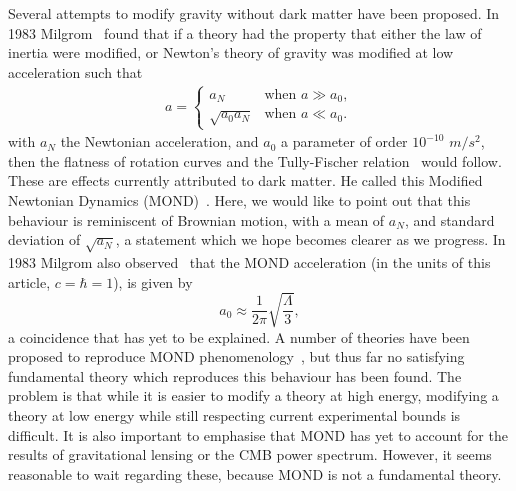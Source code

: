 \documentclass[aps,pra,amsmath,amssymb,amsthm,floatfix,nofootinbib,notitlepage,superscriptaddress,10pt]{revtex4-2}
\begin{document}
Several attempts to modify gravity without dark matter have been proposed. In 1983 Milgrom~\cite{milgrom1983modification} found that if a theory had the property that either the law of inertia were modified, or Newton's theory of gravity was modified at low acceleration such that
\begin{align}
a = 
\begin{cases} 
	a_N & \text{when } a \gg a_0, \\
	\sqrt{a_0 a_N} & \text{when } a \ll a_0.
\end{cases}
\label{eq:MONDish}
\end{align}
with $a_N$ the Newtonian acceleration, and $a_0$ a parameter of order $10^{-10}$ $m/s^2$, then  the flatness of rotation curves and the Tully-Fischer relation~\cite{TullyFisher} would follow. These are effects currently attributed to dark matter. He called this Modified Newtonian Dynamics (MOND)~\cite{sanders2002modified,bekenstein2006modified,milgrom2008mond}. Here, we would like to point out that this behaviour is reminiscent of Brownian motion, with a mean of $a_N$, and standard deviation of $\sqrt{a_N}$, a statement which we hope becomes clearer as we progress. 
In 1983 Milgrom also observed~\cite{milgrom1983modification} that the MOND acceleration (in the units of this article, $c=\hbar=1$), is given by 
   \begin{equation}
        a_0\approx\frac{1}{2\pi}\sqrt{\frac{\Lambda}{3}},
        \label{eq: coincidence}
    \end{equation}
a coincidence that has yet to be explained.  A number of theories have been proposed to reproduce MOND phenomenology~\cite{bekenstein2006modified,milgrom2008mond,jusufi2024apparent,torrome2024emergence,Finster_2024,Milgrom_1999,mondparadigm2024}, 
but thus far no satisfying fundamental theory which reproduces this behaviour has been found. The problem is that while it is easier to modify a theory at high energy, modifying a theory at low energy while still respecting current experimental bounds is difficult. It is also important to emphasise that MOND has yet to account for the results of gravitational lensing or the CMB power spectrum. However, it seems reasonable to wait regarding these, because MOND is not a fundamental theory.
\end{document}
